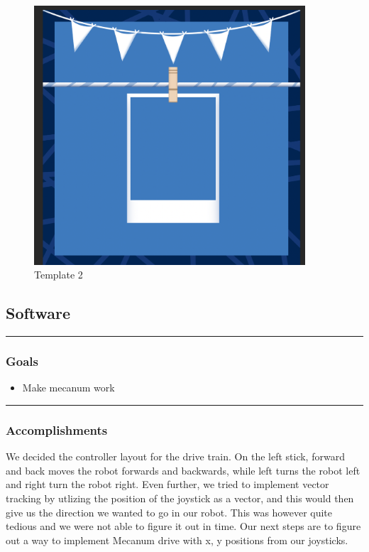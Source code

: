 \begin{figure}[htp]
\centering
\includegraphics[width=0.9\textwidth, angle=0]{Meetings/August/08-24-21/2.PNG}
\caption{Template 2}
\label{fig:pic2}
\end{figure}

\subsection{Software}
\noindent\hfil\rule{\textwidth}{.4pt}\hfil
\subsubsection{Goals}
\begin{itemize}
    \item Make mecanum work

\end{itemize} 

\noindent\hfil\rule{\textwidth}{.4pt}\hfil

\subsubsection*{Accomplishments}
We decided the controller layout for the drive train. On the left stick, forward and back moves the robot forwards and backwards, while left turns the robot left and right turn the robot right. Even further, we tried to implement vector tracking by utlizing the position of the joystick as a vector, and this would then give us the direction we wanted to go in our robot. This was however quite tedious and we were not able to figure it out in time. Our next steps are to figure out a way to implement Mecanum drive with x, y positions from our joysticks.


